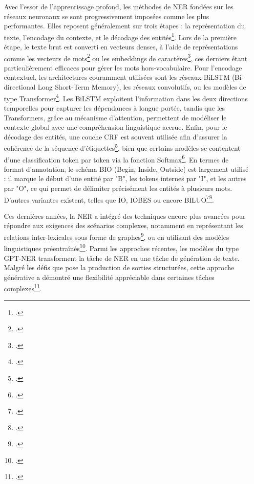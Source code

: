 \documentclass[a4paper,twoside,12pt]{book}
\begin{document}
Avec l'essor de l'apprentissage profond, les méthodes de NER fondées sur les réseaux neuronaux se sont progressivement imposées comme les plus performantes. Elles reposent généralement sur trois étapes : la représentation du texte, l'encodage du contexte, et le décodage des entités\footcite{keraghel2024}. Lors de la première étape, le texte brut est converti en vecteurs denses, à l'aide de représentations comme les vecteurs de mots\footcite{warto2024} ou les embeddings de caractères\footcite{keraghel2024}, ces derniers étant particulièrement efficaces pour gérer les mots hors-vocabulaire. Pour l'encodage contextuel, les architectures couramment utilisées sont les réseaux BiLSTM (Bi-directional Long Short-Term Memory), les réseaux convolutifs, ou les modèles de type Transformer\footcite{vaswani2023}. Les BiLSTM exploitent l'information dans les deux directions temporelles pour capturer les dépendances à longue portée, tandis que les Transformers, grâce au mécanisme d'attention, permettent de modéliser le contexte global avec une compréhension linguistique accrue. Enfin, pour le décodage des entités, une couche CRF est souvent utilisée afin d'assurer la cohérence de la séquence d'étiquettes\footcite{keraghel2024}, bien que certains modèles se contentent d'une classification token par token via la fonction Softmax\footcite{li2024}. En termes de format d'annotation, le schéma BIO (Begin, Inside, Outside) est largement utilisé : il marque le début d'une entité par "B", les tokens internes par "I", et les autres par "O", ce qui permet de délimiter précisément les entités à plusieurs mots. D'autres variantes existent, telles que IO, IOBES ou encore BILUO\footcite{keraghel2024}\footcite{zotero-664}.

Ces dernières années, la NER a intégré des techniques encore plus avancées pour répondre aux exigences des scénarios complexes, notamment en représentant les relations inter-lexicales sous forme de graphes\footcite{marcheggiani2017}, ou en utilisant des modèles linguistiques préentraînés\footcite{yang2024}. Parmi les approches récentes, les modèles du type GPT-NER transforment la tâche de NER en une tâche de génération de texte. Malgré les défis que pose la production de sorties structurées, cette approche générative a démontré une flexibilité appréciable dans certaines tâches complexes\footcite{wang2025}.
\end{document}
